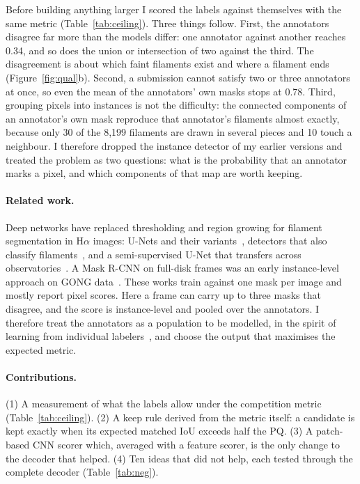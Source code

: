 \documentclass[sigconf]{acmart}
\begin{document}
Before building anything larger I scored the labels against themselves with the same metric
(Table~\ref{tab:ceiling}). Three things follow. First, the annotators disagree far more than the
models differ: one annotator against another reaches 0.34, and so does the union or intersection
of two against the third. The disagreement is about which faint filaments exist and where a
filament ends (Figure~\ref{fig:qual}b). Second, a submission cannot satisfy two or three
annotators at once, so even the mean of the annotators' own masks stops at 0.78. Third, grouping
pixels into instances is not the difficulty: the connected components of an annotator's own mask
reproduce that annotator's filaments almost exactly, because only 30 of the 8,199 filaments are
drawn in several pieces and 10 touch a neighbour. I therefore dropped the instance detector of my
earlier versions and treated the problem as two questions: what is the probability that an
annotator marks a pixel, and which components of that map are worth keeping.

\paragraph{Related work.} Deep networks have replaced thresholding and region growing for
filament segmentation in H$\alpha$ images: U-Nets and their variants~\cite{zhu2019,liu2021},
detectors that also classify filaments~\cite{guo2022}, and a semi-supervised U-Net that transfers
across observatories~\cite{diercke2024}. A Mask R-CNN on full-disk frames was an early
instance-level approach on GONG data~\cite{ahmadzadeh2019}. These works train against one mask per
image and mostly report pixel scores. Here a frame can carry up to three masks that disagree, and
the score is instance-level and pooled over the annotators. I therefore treat the annotators as a
population to be modelled, in the spirit of learning from individual labelers~\cite{guan2018}, and
choose the output that maximises the expected metric.

\paragraph{Contributions.} (1) A measurement of what the labels allow under the competition
metric (Table~\ref{tab:ceiling}). (2) A keep rule derived from the metric itself: a candidate is
kept exactly when its expected matched IoU exceeds half the PQ. (3) A patch-based CNN scorer which,
averaged with a feature scorer, is the only change to the decoder that helped. (4) Ten ideas that
did not help, each tested through the complete decoder (Table~\ref{tab:neg}).
\end{document}
